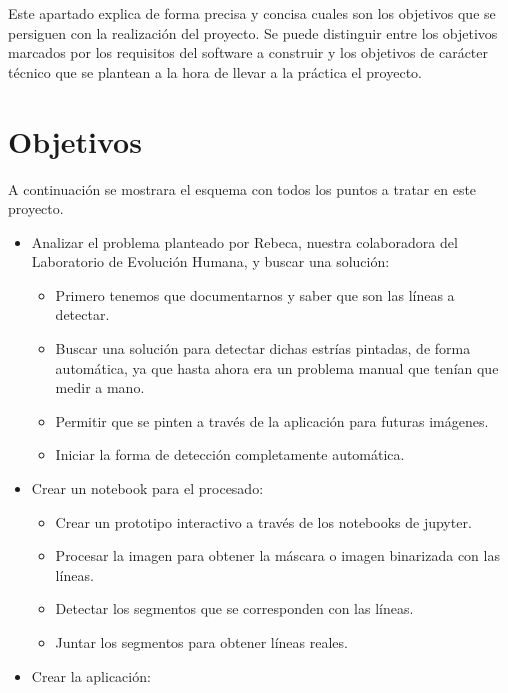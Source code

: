 
Este apartado explica de forma precisa y concisa cuales son los objetivos que se persiguen con la realización del proyecto. Se puede distinguir entre los objetivos marcados por los requisitos del software a construir y los objetivos de carácter técnico que se plantean a la hora de llevar a la práctica el proyecto.

\section{Objetivos}
A continuación se mostrara el esquema con todos los puntos a tratar en este proyecto.
\begin{itemize}
\item Analizar el problema planteado por Rebeca, nuestra colaboradora del Laboratorio de Evolución Humana, y buscar una solución:
	\begin{itemize}
		\item Primero tenemos que documentarnos y saber que son las líneas a detectar.
		\item Buscar una solución para detectar dichas estrías pintadas, de forma automática, ya que hasta ahora era un problema manual que tenían que medir a mano.
		\item Permitir que se pinten a través de la aplicación para futuras imágenes.
		\item Iniciar la forma de detección completamente automática.
	\end{itemize}
\item Crear un notebook para el procesado:
	\begin{itemize}
		\item Crear un prototipo interactivo a través de los notebooks de jupyter.
		\item Procesar la imagen para obtener la máscara o imagen binarizada con las líneas.
		\item Detectar los segmentos que se corresponden con las líneas.
		\item Juntar los segmentos para obtener líneas reales.
	\end{itemize}
\item Crear la aplicación:
\end{itemize}

